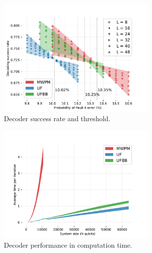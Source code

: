 \documentclass[11pt, a4paper, twoside, titlepage, usenames,dvipsnames]{report}
\begin{document}
\begin{figure}
     \centering
     \includegraphics[width=0.7\textwidth]{threshold.pdf}
     \caption{Decoder success rate and threshold.}\label{fig4}
\end{figure}

\begin{figure}
     \centering
     \includegraphics[width=0.7\textwidth]{time.pdf}
     \caption{Decoder performance in computation time.}\label{fig5}
\end{figure}
\end{document}
